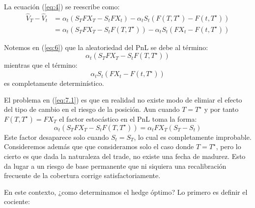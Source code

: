\documentclass[12pt]{article}
\begin{document}
La ecuación (\ref{eq:4}) se reescribe como:
\begin{equation}
\begin{split}
            \hat{V}_T - \hat{V}_t  & = \alpha_t\left(S_TFX_T - S_tFX_t\right) - \alpha_tS_t\left(F(T, T^\star) - F(t, T^\star)\right) \\
            & = \alpha_t\left(S_TFX_T - S_tF(T, T^\star)\right) - \alpha_tS_t\left(FX_t - F(t, T^\star)\right)
\end{split}
        \label{eq:6}
\end{equation}

 Notemos en (\ref{eq:6}) que  la aleatoriedad del PnL se debe al término:
 \begin{equation}
    \alpha_t\left(S_TFX_T - S_tF(T, T^\star)\right)    
    \label{eq:7.1}
 \end{equation}
 mientras que el término:
 \begin{equation}
     \alpha_tS_t\left(FX_t - F(t, T^\star)\right)
     \label{eq:7.2}
 \end{equation}
 es completamente determinístico.
 
El problema en (\ref{eq:7.1})  es que en realidad no existe modo de elimiar el efecto del tipo de cambio en el riesgo de la posición. Aun cuando  $T = T^\star$ y por tanto $F(T, T^\star) = FX_T$ el factor estocástico en el PnL toma la forma:
 \begin{equation}
     \alpha_t\left(S_TFX_T - S_tF(T, T^\star)\right) = \alpha_tFX_T\left(S_T - S_t\right) 
     \label{eq:7.3}
 \end{equation}
 Este factor desaparece solo cuando $S_t = S_T$, lo cual es completamente improbable. Consideremos además que que consideramos solo el caso donde $T = T^\star$, pero lo cierto es que dada la naturaleza del trade, no existe una fecha de madurez. Esto da lugar a un riesgo de base permanente que ni siquiera una recalibración frecuente de la cobertura corrige satisfactoriamente.

En este contexto, ¿como determinamos el hedge óptimo? Lo primero es definir el cociente:
\end{document}

